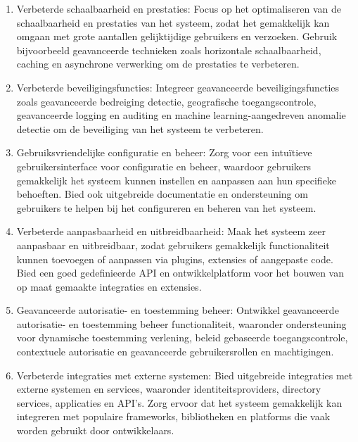 \begin{enumerate}
  \item Verbeterde schaalbaarheid en prestaties: Focus op het optimaliseren van de schaalbaarheid en prestaties van het systeem, zodat het gemakkelijk kan omgaan met grote aantallen gelijktijdige gebruikers en verzoeken. Gebruik bijvoorbeeld geavanceerde technieken zoals horizontale schaalbaarheid, caching en asynchrone verwerking om de prestaties te verbeteren.
  
  \item Verbeterde beveiligingsfuncties: Integreer geavanceerde beveiligingsfuncties zoals geavanceerde bedreiging detectie, geografische toegangscontrole, geavanceerde logging en auditing en machine learning-aangedreven anomalie detectie om de beveiliging van het systeem te verbeteren.
  
  \item Gebruiksvriendelijke configuratie en beheer: Zorg voor een intuïtieve gebruikersinterface voor configuratie en beheer, waardoor gebruikers gemakkelijk het systeem kunnen instellen en aanpassen aan hun specifieke behoeften. Bied ook uitgebreide documentatie en ondersteuning om gebruikers te helpen bij het configureren en beheren van het systeem.
  
  \item Verbeterde aanpasbaarheid en uitbreidbaarheid: Maak het systeem zeer aanpasbaar en uitbreidbaar, zodat gebruikers gemakkelijk functionaliteit kunnen toevoegen of aanpassen via plugins, extensies of aangepaste code. Bied een goed gedefinieerde API en ontwikkelplatform voor het bouwen van op maat gemaakte integraties en extensies.
  
  \item Geavanceerde autorisatie- en toestemming beheer: Ontwikkel geavanceerde autorisatie- en toestemming beheer functionaliteit, waaronder ondersteuning voor dynamische toestemming verlening, beleid gebaseerde toegangscontrole, contextuele autorisatie en geavanceerde gebruikersrollen en machtigingen.
  
  \item Verbeterde integraties met externe systemen: Bied uitgebreide integraties met externe systemen en services, waaronder identiteitsproviders, directory services, applicaties en API's. Zorg ervoor dat het systeem gemakkelijk kan integreren met populaire frameworks, bibliotheken en platforms die vaak worden gebruikt door ontwikkelaars.
\end{enumerate}

